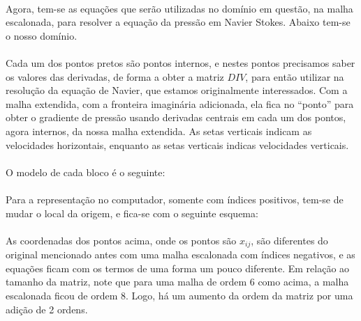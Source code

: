 \documentclass[poisson.tex]{subfiles}
\begin{document}
\paragraph{} Agora, tem-se as equações que serão utilizadas no domínio em questão, na malha escalonada, para resolver a equação da pressão em Navier Stokes. Abaixo tem-se o nosso domínio.
\domainOne

\paragraph{} Cada um dos pontos pretos são pontos internos, e nestes pontos precisamos saber os valores das derivadas, de forma a obter a matriz $DIV$, para então utilizar na resolução da equação de Navier, que estamos originalmente interessados. Com a malha extendida, com a fronteira imaginária adicionada, ela fica no ``ponto'' para obter o gradiente de pressão usando derivadas centrais em cada um dos pontos, agora internos, da nossa malha extendida. As setas verticais indicam as velocidades horizontais, enquanto as setas verticais indicas velocidades verticais. 

\paragraph{} O modelo de cada bloco é o seguinte:


\paragraph{} Para a representação no computador, somente com índices positivos, tem-se de mudar o local da origem, e fica-se com o seguinte esquema:
\esquemaUm

\paragraph{} As coordenadas dos pontos acima, onde os pontos são $x_{ij}$, são diferentes do original mencionado antes com uma malha escalonada com índices negativos, e as equações ficam com os termos de uma forma um pouco diferente. Em relação ao tamanho da matriz, note que para uma malha de ordem 6 como acima, a malha escalonada ficou de ordem 8. Logo, há um aumento da ordem da matriz por uma adição de 2 ordens.
\end{document}

